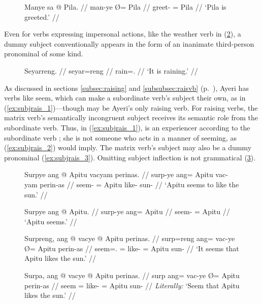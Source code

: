 \begin{figure}[h]
\ex\label{ex:passnosubj}\begingl
	\gla Manye sa @ Pila. //
	\glb man-ye Ø= Pila //
	\glc greet-\TsgF{} \Parg{}= Pila //
	\glft `Pila is greeted.' //
\endgl\xe
\end{figure}

Even for verbs expressing impersonal actions, like the weather verb in
(\ref{ex:weatherverb}), a dummy subject conventionally appears in the form of
an inanimate third-person pronominal of some kind.

\begin{figure}[h]
\ex\label{ex:weatherverb}
\begingl
	\gla Seyarreng. //
	\glb seyar=reng //
	\glc rain=\TsgI{}.\Aarg{} //
	\glft `It is raining.' //
\endgl\xe
\end{figure}

As discussed in sections \ref{subsec:raising} and \ref{subsubsec:raisvb}
(p.~\pageref{subsubsec:raisvb}), Ayeri has verbs like 
{seem}, which can make a subordinate verb's subject their own, as in
(\ref{ex:subjrais_1})---though  may be Ayeri's only
raising verb. For raising verbs, the matrix verb's semantically incongruent
subject receives its semantic role from the subordinate verb. Thus, in
(\ref{ex:subjrais_1}),  is an experiencer according to the
subordinate verb ; she is not someone who acts in
a manner of seeming, as (\ref{ex:subjrais_2}) would imply. The matrix verb's
subject may also be a dummy pronominal (\ref{ex:subjrais_3}). Omitting subject
inflection is not grammatical (\ref{ex:subjrais_4}).

\begin{figure}
\pex\label{ex:subjrais}
\a\label{ex:subjrais_1}\begingl
	\gla Surpye ang @ Apitu vacyam perinas. //
	\glb surp-ye ang= Apitu vac-yam perin-as //
	\glc seem-\TsgF{} \Aarg{}= Apitu like-\Ptcp{} sun-\Parg{} //
	\glft `Apitu seems to like the sun.' //
\endgl

\a\label{ex:subjrais_2}\ljudge*\begingl
	\gla Surpye ang @ Apitu. //
	\glb surp-ye ang= Apitu //
	\glc seem-\TsgF{} \Aarg{}= Apitu //
	\glft `Apitu seems.' //
\endgl

\a\label{ex:subjrais_3}\begingl
	\gla Surpreng, ang @ vacye {} @ Apitu perinas. //
	\glb surp=reng ang= vac-ye Ø= Apitu perin-as //
	\glc seem=\TsgI{}.\Aarg{} \AgtT{}= like-\TsgF{} \Top{}= Apitu 
		sun-\Parg{} //
	\glft `It seems that Apitu likes the sun.' //
\endgl

\a\label{ex:subjrais_4}\ljudge*\begingl
	\gla Surpa, ang @ vacye {} @ Apitu perinas. //
	\glb surp ang= vac-ye Ø= Apitu perin-as //
	\glc seem \AgtT{}= like-\TsgF{} \Top{}= Apitu sun-\Parg{} //
	\glft \textit{Literally:} `Seem that Apitu likes the sun.' //
\endgl

\xe
\end{figure}

